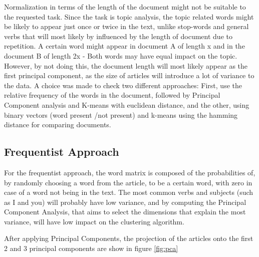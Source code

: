\documentclass[a4paper,10pt]{article}
\begin{document}
Normalization in terms of the length of the document might not be suitable to the requested task. Since the task is topic analysis, the topic related words might be likely to appear just once or twice in the text, unlike stop-words and general verbs that will most likely by influenced by the length of document due to repetition. A certain word might appear in document A of length x and in the document B of length 2x - Both words may have equal impact on the topic. However, by not doing this, the document length will most likely appear as the first principal component, as the size of articles will introduce a lot of variance to the data. A choice was made to check two different approaches: First, use the relative frequency of the words in the document, followed by Principal Component analysis and K-means with euclidean distance, and the other, using binary vectors (word present /not present) and k-means using the hamming distance for comparing documents.

\subsection{Frequentist Approach}
For the frequentist approach, the word matrix is composed of the probabilities of, by randomly choosing a word from the article, to be a certain word, with zero in case of a word not being in the text. The most common verbs and subjects (such as I and you) will probably have low variance, and by computing the Principal Component Analysis, that aims to select the dimensions that explain the most variance, will have low impact on the clustering algorithm.

After applying Principal Components, the projection of the articles onto the first 2 and 3 principal components are show in figure \ref{fig:pca}
\end{document}
